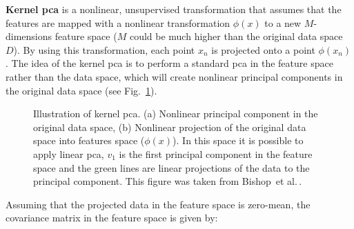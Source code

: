 \begin{description}
\item \textbf{Kernel \ac{pca}} is a nonlinear, unsupervised transformation that assumes that the features are mapped with a nonlinear transformation $\phi(x)$ to a new $M$-dimensions feature space ($M$ could be much higher than the original data space $D$).
By using this transformation, each point $x_{n}$ is projected onto a point $\phi(x_{n})$. 
The idea of the kernel \ac{pca} is to perform a standard \ac{pca} in the feature space rather than the data space, which will create nonlinear principal components in the original data space (see Fig.~\ref{fig:kpca}).
\begin{figure}
\centering
{}\hfill
{}
\caption[Kernel \ac{pca}]{Illustration of kernel \ac{pca}. (a) Nonlinear principal component in the original data space, (b) Nonlinear projection of the original data space into features space ($\phi(x)$).
In this space it is possible to apply linear \ac{pca}, $v_{1}$ is the first principal component in the feature space and the green lines are linear projections of the data to the principal component. This figure was taken from Bishop~et al.\,\cite{bishop2006pattern}.}
\label{fig:kpca}
\end{figure}   
Assuming that the projected data in the feature space is zero-mean, the covariance matrix in the feature space is given by: 

\end{description}
